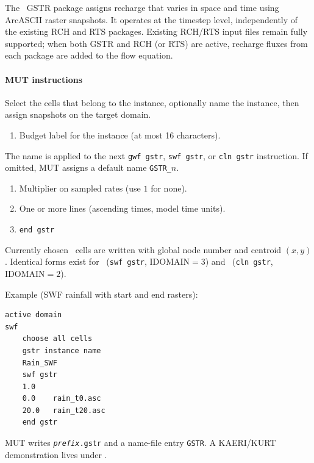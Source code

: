The \mfus\ \textsf{GSTR} package assigns recharge that varies in space and time using ArcASCII raster snapshots.
It operates at the timestep level, independently of the existing \textsf{RCH} and \textsf{RTS} packages.
Existing \textsf{RCH}/\textsf{RTS} input files remain fully supported; when both \textsf{GSTR} and \textsf{RCH} (or \textsf{RTS}) are active, recharge fluxes from each package are added to the flow equation.

\paragraph*{MUT instructions}
Select the cells that belong to the instance, optionally name the instance, then assign snapshots on the target domain.

    {
    \squish
    \begin{enumerate}
    \item {} Budget label for the instance (at most 16 characters).
    \end{enumerate}
    The name is applied to the next \texttt{gwf gstr}, \texttt{swf gstr}, or \texttt{cln gstr} instruction.
    If omitted, MUT assigns a default name \texttt{GSTR\_$n$}.
}

{
    \squish
    \begin{enumerate}
    \item {} Multiplier on sampled rates (use $1$ for none).
    \item One or more lines   (ascending times, model time units).
    \item \texttt{end gstr}
    \end{enumerate}
    Currently chosen \gwf\ cells are written with global node number and centroid $(x,y)$.
    Identical forms exist for \swf\ (\texttt{swf gstr}, IDOMAIN$=3$) and \cln\ (\texttt{cln gstr}, IDOMAIN$=2$).
}

Example (SWF rainfall with start and end rasters):
\begin{verbatim}
active domain
swf
    choose all cells
    gstr instance name
    Rain_SWF
    swf gstr
    1.0
    0.0    rain_t0.asc
    20.0   rain_t20.asc
    end gstr
\end{verbatim}

MUT writes \texttt{\textit{prefix}.gstr} and a name-file entry \texttt{GSTR}.
A KAERI/KURT demonstration lives under
.


